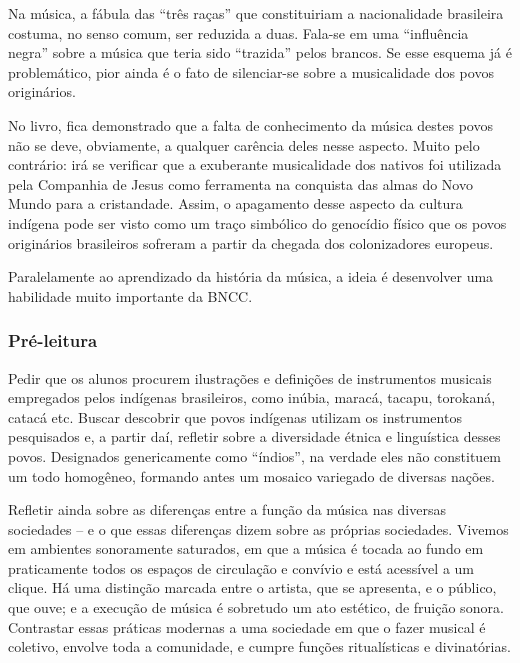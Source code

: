\documentclass[11pt]{extarticle}
\begin{document}
Na música, a fábula das “três raças” que constituiriam a nacionalidade
brasileira costuma, no senso comum, ser reduzida a duas. Fala-se em uma
“influência negra” sobre a música que teria sido “trazida” pelos brancos. Se
esse esquema já é problemático, pior ainda é o fato de silenciar-se sobre a
musicalidade dos povos originários.

No livro, fica demonstrado que a falta de conhecimento da música destes povos
não se deve, obviamente, a qualquer carência deles nesse aspecto. Muito pelo
contrário: irá se verificar que a exuberante musicalidade dos nativos foi
utilizada pela Companhia de Jesus como ferramenta na conquista das almas do
Novo Mundo para a cristandade. Assim, o apagamento desse aspecto da cultura
indígena pode ser visto como um traço simbólico do genocídio físico que os
povos originários brasileiros sofreram a partir da chegada dos colonizadores
europeus. 

Paralelamente ao aprendizado da história da música, a ideia é desenvolver uma habilidade muito importante da BNCC.



\subsubsection{Pré-leitura}

Pedir que os alunos procurem ilustrações e definições de instrumentos musicais
empregados pelos indígenas brasileiros, como inúbia, maracá, tacapu, torokaná,
catacá etc. Buscar descobrir que povos indígenas utilizam os instrumentos
pesquisados e, a partir daí, refletir sobre a diversidade étnica e linguística
desses povos. Designados genericamente como “índios”, na verdade eles não
constituem um todo homogêneo, formando antes um mosaico variegado de diversas
nações.


Refletir ainda sobre as diferenças entre a função da música nas diversas
sociedades – e o que essas diferenças dizem sobre as próprias sociedades.
Vivemos em ambientes sonoramente saturados, em que a música é tocada ao fundo
em praticamente todos os espaços de circulação e convívio e está acessível a
um clique. Há uma distinção marcada entre o artista, que se apresenta, e o
público, que ouve; e a execução de música é sobretudo um ato estético, de
fruição sonora. Contrastar essas práticas modernas a uma sociedade em que o
fazer musical é coletivo, envolve toda a comunidade, e cumpre funções
ritualísticas e divinatórias.
\end{document}
